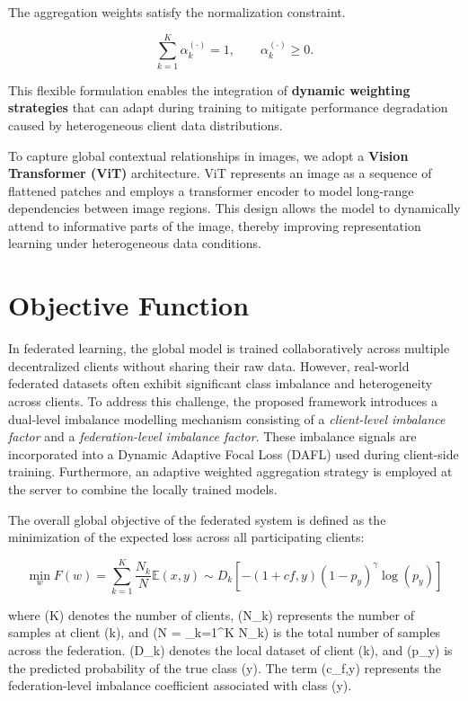 \documentclass[12pt]{book}
\begin{document}
The aggregation weights satisfy the normalization constraint.

\begin{equation}
\sum_{k=1}^{K} \alpha_k^{(\cdot)} = 1, \qquad \alpha_k^{(\cdot)} \ge 0 .
\end{equation}

This flexible formulation enables the integration of \textbf{dynamic weighting strategies} that can adapt during training to mitigate performance degradation caused by heterogeneous client data distributions.

To capture global contextual relationships in images, we adopt a \textbf{Vision Transformer (ViT)} architecture. ViT represents an image as a sequence of flattened patches and employs a transformer encoder to model long-range dependencies between image regions. This design allows the model to dynamically attend to informative parts of the image, thereby improving representation learning under heterogeneous data conditions.

\section{Objective Function}
In federated learning, the global model is trained collaboratively across multiple decentralized clients without sharing their raw data. However, real-world federated datasets often exhibit significant class imbalance and heterogeneity across clients. To address this challenge, the proposed framework introduces a dual-level imbalance modelling mechanism consisting of a \textit{client-level imbalance factor} and a \textit{federation-level imbalance factor}. These imbalance signals are incorporated into a Dynamic Adaptive Focal Loss (DAFL) used during client-side training. Furthermore, an adaptive weighted aggregation strategy is employed at the server to combine the locally trained models.

The overall global objective of the federated system is defined as the minimization of the expected loss across all participating clients:

\begin{equation}
\min_{w} F(w) =
\sum_{k=1}^{K} \frac{N_k}{N}
\mathbb{E}{(x,y)\sim D_k}
\left[
-(1 + c{f,y})(1 - p_y)^{\gamma} \log(p_y)
\right]
\end{equation}

where (K) denotes the number of clients, (N_k) represents the number of samples at client (k), and (N = \sum_{k=1}^{K} N_k) is the total number of samples across the federation. (D_k) denotes the local dataset of client (k), and (p_y) is the predicted probability of the true class (y). The term (c_{f,y}) represents the federation-level imbalance coefficient associated with class (y).
\end{document}
